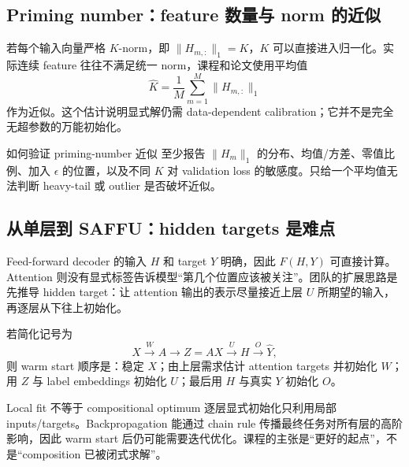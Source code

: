 \subsection{Priming number：feature 数量与 norm 的近似}

若每个输入向量严格 $K$-norm，即 $\|H_{m,:}\|_1=K$，$K$ 可以直接进入归一化。实际连续 feature 往往不满足统一 norm，课程和论文使用平均值
\[
\widehat K=\frac{1}{M}\sum_{m=1}^{M}\|H_{m,:}\|_1
\]
作为近似。这个估计说明显式解仍需 data-dependent calibration；它并不是完全无超参数的万能初始化。

\begin{knowledgebox}{如何验证 priming-number 近似}
至少报告 $\|H_m\|_1$ 的分布、均值/方差、零值比例、加入 $\epsilon$ 的位置，以及不同 $K$ 对 validation loss 的敏感度。只给一个平均值无法判断 heavy-tail 或 outlier 是否破坏近似。
\end{knowledgebox}


\subsection{从单层到 SAFFU：hidden targets 是难点}

Feed-forward decoder 的输入 $H$ 和 target $Y$ 明确，因此 $F(H,Y)$ 可直接计算。Attention 则没有显式标签告诉模型“第几个位置应该被关注”。团队的扩展思路是先推导 hidden target：让 attention 输出的表示尽量接近上层 $U$ 所期望的输入，再逐层从下往上初始化。

若简化记号为
\[
X\xrightarrow{W} A\xrightarrow{} Z=AX
\xrightarrow{U} H\xrightarrow{O}\hat Y,
\]
则 warm start 顺序是：稳定 $X$；由上层需求估计 attention targets 并初始化 $W$；用 $Z$ 与 label embeddings 初始化 $U$；最后用 $H$ 与真实 $Y$ 初始化 $O$。

\begin{warningbox}{Local fit 不等于 compositional optimum}
逐层显式初始化只利用局部 inputs/targets。Backpropagation 能通过 chain rule 传播最终任务对所有层的高阶影响，因此 warm start 后仍可能需要迭代优化。课程的主张是“更好的起点”，不是“composition 已被闭式求解”。
\end{warningbox}


